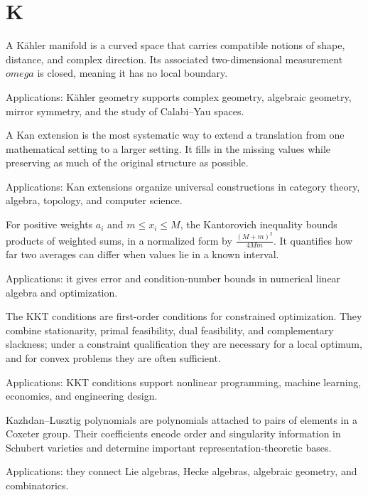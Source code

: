 \chapter*{K}
\label{chap:k}

A Kähler manifold is a curved space that carries compatible notions of shape, distance, and complex direction. Its associated two-dimensional measurement $omega$ is closed, meaning it has no local boundary. \par\noindent Applications: Kähler geometry supports complex geometry, algebraic geometry, mirror symmetry, and the study of Calabi--Yau spaces.

A Kan extension is the most systematic way to extend a translation from one mathematical setting to a larger setting. It fills in the missing values while preserving as much of the original structure as possible. \par\noindent Applications: Kan extensions organize universal constructions in category theory, algebra, topology, and computer science.

For positive weights $a_i$ and $m\leq x_i\leq M$, the Kantorovich inequality bounds products of weighted sums, in a normalized form by $\frac{(M+m)^2}{4Mm}$. It quantifies how far two averages can differ when values lie in a known interval. \par\noindent Applications: it gives error and condition-number bounds in numerical linear algebra and optimization.

The KKT conditions are first-order conditions for constrained optimization. They combine stationarity, primal feasibility, dual feasibility, and complementary slackness; under a constraint qualification they are necessary for a local optimum, and for convex problems they are often sufficient. \par\noindent Applications: KKT conditions support nonlinear programming, machine learning, economics, and engineering design.

Kazhdan--Lusztig polynomials are polynomials attached to pairs of elements in a Coxeter group. Their coefficients encode order and singularity information in Schubert varieties and determine important representation-theoretic bases. \par\noindent Applications: they connect Lie algebras, Hecke algebras, algebraic geometry, and combinatorics.

